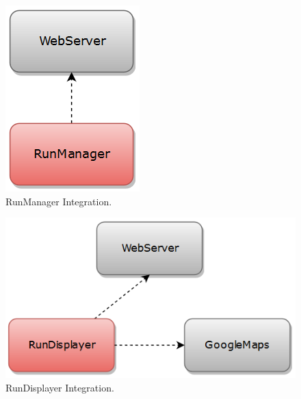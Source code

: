 \begin{figure}[H]
\centering
\includegraphics[scale=0.7]{Images/IntegrationPlanImages/fig13.png}
\caption{RunManager Integration.}
\end{figure}

\begin{figure}[H]
\centering
\includegraphics[scale=0.7]{Images/IntegrationPlanImages/fig14.png}
\caption{RunDisplayer Integration.}
\end{figure}



